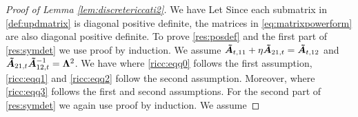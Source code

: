 \begin{proof}[Proof of Lemma \ref{lem:discretericcati2}]
We have
Let
Since each submatrix  in \eqref{def:updmatrix} is diagonal positive definite,  the matrices in  \eqref{eq:matrixpowerform} are also diagonal positive definite.  To prove \ref{res:posdef} and the first part of \ref{res:symdet}  we use proof by induction.  We assume   $\boldsymbol{\tilde{A}}_{t,11} + \eta \boldsymbol{\tilde{A}}_{21, t} = \boldsymbol{\tilde{A}}_{t,12}$ and  $\boldsymbol{\tilde{A}}_{21, t} \boldsymbol{\tilde{A}}^{-1}_{12, t} = \boldsymbol{\Lambda}^2$.
We have
where  \eqref{ricc:eqq0}  follows the first assumption, \eqref{ricc:eqq1}  and \eqref{ricc:eqq2} follow the second assumption. 
Moreover,
where \eqref{ricc:eqq3}  follows the first and second assumptions. For the second part of  \ref{res:symdet}  we again use proof by induction.  We assume 

\end{proof}
